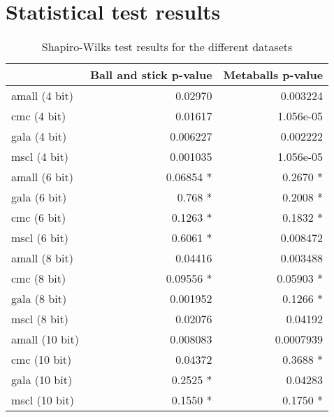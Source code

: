 \appendix

\chapter{Statistical test results}
\label{cha:statsresults}

\begin{table}[h!]
  \begin{tabular}{ | l | r | r | }
  \hline
                 & Ball and stick p-value & Metaballs p-value  \\ \hline
  amall (4 bit)  &                0.02970 &          0.003224  \\ \hline
  cmc (4 bit)    &                0.01617 &         1.056e-05  \\ \hline
  gala (4 bit)   &               0.006227 &          0.002222  \\ \hline
  mscl (4 bit)   &               0.001035 &         1.056e-05  \\ \hline
  \hline

  amall (6 bit)  &              0.06854 * &          0.2670 *  \\ \hline
  gala (6 bit)   &                0.768 * &          0.2008 *  \\ \hline
  cmc (6 bit)    &               0.1263 * &          0.1832 *  \\ \hline
  mscl (6 bit)   &               0.6061 * &          0.008472  \\ \hline
  \hline

  amall (8 bit)  &                0.04416 &          0.003488  \\ \hline
  cmc (8 bit)    &              0.09556 * &         0.05903 *  \\ \hline
  gala (8 bit)   &               0.001952 &          0.1266 *  \\ \hline
  mscl (8 bit)   &                0.02076 &           0.04192  \\ \hline
  \hline

  amall (10 bit) &               0.008083 &         0.0007939  \\ \hline
  cmc (10 bit)   &                0.04372 &          0.3688 *  \\ \hline
  gala (10 bit)  &               0.2525 * &           0.04283  \\ \hline
  mscl (10 bit)  &               0.1550 * &          0.1750 *  \\ \hline
  \end{tabular}
  \caption{Shapiro-Wilks test results for the different datasets}
  \label{tab:dataset_normality}
\end{table}

